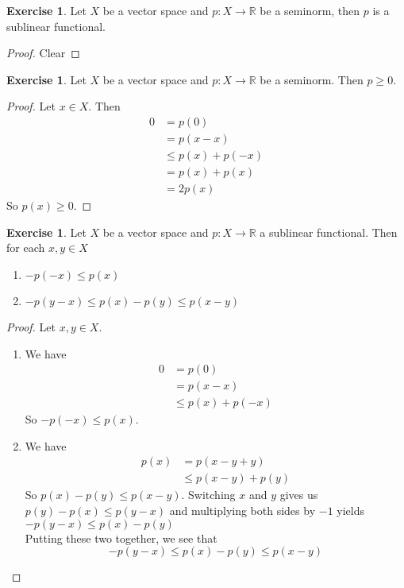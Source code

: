 \documentclass[12pt]{amsart}
\theoremstyle{definition}
\newtheorem{ex}[definition]{Exercise}
\newcommand{\R}{\mathbb{R}}
\begin{document}
	\begin{ex}
		Let $X$ be a vector space and $p: X \rightarrow \R$ be a seminorm, then $p$ is a sublinear functional.
	\end{ex}
	
	\begin{proof}
	Clear
	\end{proof}
	
	\begin{ex}
	Let $X$ be a vector space and $p: X \rightarrow \R$ be a seminorm. Then $p \geq 0$. 
	\end{ex}
	
	\begin{proof}
	Let $x \in X$. Then 
	\begin{align*}
	0 
	&= p(0) \\ 
	&= p(x - x) \\
	&\leq  p(x) + p(-x) \\
	&= p(x) + p(x) \\
	&= 2p(x)
	\end{align*}
	So $p(x) \geq 0$.
	\end{proof}
	
	\begin{ex}
	Let $X$ be a vector space and $p:X \rightarrow \R$ a sublinear functional. Then for each $x, y \in X$
	\begin{enumerate}
	\item $-p(-x) \leq p(x)$
	\item $- p(y-x) \leq p(x) - p(y) \leq p(x-y)$
	\end{enumerate}
	\end{ex}
	
	\begin{proof}
	Let $x, y \in X$.
	\begin{enumerate}
	\item We have
	\begin{align*}
	0
	&= p(0) \\ 
	&= p(x - x) \\
	& \leq p(x) + p(-x)
	\end{align*}
	So $-p(-x) \leq p(x)$.
	\item We have
	\begin{align*}
	p(x)
	&= p(x -y + y) \\
	& \leq p(x-y) + p(y)
	\end{align*}
	So $p(x) - p(y) \leq p(x-y)$. Switching $x$ and $y$ gives us $p(y) - p(x) \leq p(y-x)$ and multiplying both sides by $-1$ yields $-p(y-x) \leq p(x) - p(y)$ \\ 
	Putting these two together, we see that $$-p(y-x) \leq p(x) - p(y) \leq p(x-y)$$
	\end{enumerate}
	\end{proof}
	
\end{document}
